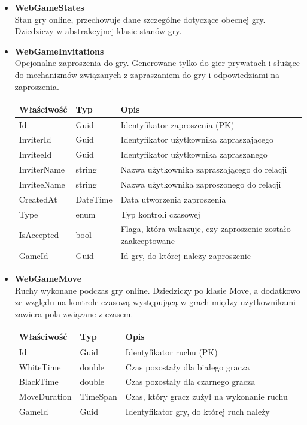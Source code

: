 \documentclass[12pt,a4paper]{article}
\begin{document}
\begin{itemize}
    \item \textbf{WebGameStates}\\
    Stan gry online, przechowuje dane szczególne dotyczące obecnej gry. Dziedziczy w abstrakcyjnej klasie stanów gry.
    
    \item \textbf{WebGameInvitations}\\
    Opcjonalne zaproszenia do gry. Generowane tylko do gier prywatach i służące do mechanizmów związanych z zapraszaniem do gry i odpowiedziami na zaproszenia.
    \renewcommand{\arraystretch}{1.5}
    \begin{longtable}{|m{4cm}|m{2cm}|m{8cm}|}
        \hline
        \rowcolor{lightgray}
        \textbf{Właściwość} & \textbf{Typ} & \textbf{Opis} \\ \hline
        \endhead
        \hline
        Id & Guid & Identyfikator zaproszenia (PK) \\ \hline
        InviterId & Guid & Identyfikator użytkownika zapraszającego \\ \hline
        InviteeId & Guid & Identyfikator użytkownika zapraszanego \\ \hline
        InviterName & string & Nazwa użytkownika zapraszającego do relacji \\ \hline
        InviteeName & string & Nazwa użytkownika zaproszonego do relacji \\ \hline
        CreatedAt & DateTime & Data utworzenia zaproszenia \\ \hline
        Type & enum & Typ kontroli czasowej \\ \hline
        IsAccepted & bool & Flaga, która wskazuje, czy zaproszenie zostało zaakceptowane \\ \hline
        GameId & Guid & Id gry, do której należy zaproszenie \\ \hline
    \end{longtable}

\newpage

    \item \textbf{WebGameMove}\\
    Ruchy wykonane podczas gry online. Dziedziczy po klasie Move, a dodatkowo ze względu na kontrole czasową występującą w grach między użytkownikami zawiera pola związane z czasem.
    \renewcommand{\arraystretch}{1.5}
    \begin{longtable}{|m{4cm}|m{2cm}|m{8cm}|}
        \hline
        \rowcolor{lightgray}
        \textbf{Właściwość} & \textbf{Typ} & \textbf{Opis} \\ \hline
        \endhead
        \hline
        Id & Guid & Identyfikator ruchu (PK) \\ \hline
        WhiteTime & double & Czas pozostały dla białego gracza \\ \hline
        BlackTime & double & Czas pozostały dla czarnego gracza \\ \hline
        MoveDuration & TimeSpan & Czas, który gracz zużył na wykonanie ruchu \\ \hline
        GameId & Guid & Identyfikator gry, do której ruch należy \\ \hline
    \end{longtable}
        

\end{itemize}
\end{document}
